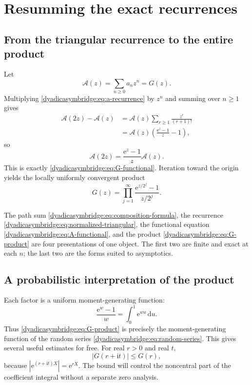 \documentclass[11pt,oneside]{article}
\theoremstyle{definition}
\theoremstyle{remark}
\newcommand{\e}{\mathrm e}
\newcommand{\ii}{\mathrm i}
\newcommand{\dd}{\,\mathrm d}
\begin{document}
\section{Resumming the exact recurrences}
\label{dyadicasymbridge:sec:resummation}

\subsection{From the triangular recurrence to the entire product}
\label{dyadicasymbridge:subsec:composition-resummation}

Let
\begin{equation}
 \mathscr A(z)=\sum_{n\ge0}a_nz^n=G(z).
\label{dyadicasymbridge:eq:A-series}
\end{equation}
Multiplying \eqref{dyadicasymbridge:eq:a-recurrence} by $z^n$ and summing over $n\ge1$ gives
\begin{align*}
 \mathscr A(2z)-\mathscr A(z)
 &=\mathscr A(z)\sum_{r\ge1}\frac{z^r}{(r+1)!}\\
 &=\mathscr A(z)\left(\frac{\e^z-1}{z}-1\right),
\end{align*}
so
\begin{equation}
 \mathscr A(2z)=\frac{\e^z-1}{z}\mathscr A(z).
\label{dyadicasymbridge:eq:A-functional}
\end{equation}
This is exactly \eqref{dyadicasymbridge:eq:G-functional}.  Iteration toward the origin yields the locally uniformly convergent product
\begin{equation}
 \boxed{
 G(z)=\prod_{j=1}^{\infty}
 \frac{\e^{z/2^j}-1}{z/2^j}.}
\label{dyadicasymbridge:eq:G-product}
\end{equation}

The path sum \eqref{dyadicasymbridge:eq:composition-formula}, the recurrence
\eqref{dyadicasymbridge:eq:normalized-triangular}, the functional equation \eqref{dyadicasymbridge:eq:A-functional}, and the product \eqref{dyadicasymbridge:eq:G-product} are four presentations of one object.  The first two are finite and exact at each $n$; the last two are the forms suited to asymptotics.

\subsection{A probabilistic interpretation of the product}

Each factor is a uniform moment-generating function:
\begin{equation}
 \frac{\e^w-1}{w}=\int_0^1\e^{wu}\dd u.
\label{dyadicasymbridge:eq:uniform-mgf}
\end{equation}
Thus \eqref{dyadicasymbridge:eq:G-product} is precisely the moment-generating function of the random series \eqref{dyadicasymbridge:eq:random-series}.  This gives several useful estimates for free.  For real $r>0$ and real $t$,
\begin{equation}
 |G(r+\ii t)|\le G(r),
\label{dyadicasymbridge:eq:G-vertical-bound}
\end{equation}
because $|\e^{(r+\ii t)X}|=\e^{rX}$.  The bound will control the noncentral part of the coefficient integral without a separate zero analysis.
\end{document}
